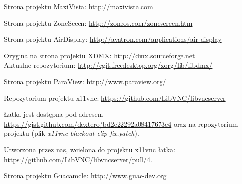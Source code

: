   \vfill

\pagebreak
\begin{thebibliography}{9}

    Strona projektu MaxiVista: \url{http://maxivista.com}

    Strona projektu ZoneSceen: \url{http://zoneos.com/zonescreen.htm}

    Strona projektu AirDisplay: \url{http://avatron.com/applications/air-display}

    Oryginalna strona projektu XDMX: \url{http://dmx.sourceforge.net} \\
    Aktualne repozytorium: \url{http://cgit.freedesktop.org/xorg/lib/libdmx/}

    Strona projektu ParaView: \url{http://www.paraview.org/}

    Repozytorium projektu x11vnc: \url{https://github.com/LibVNC/libvncserver}

    Łatka jest dostępna pod adresem \url{https://gist.github.com/dextero/bd2e22292a08417673e4} oraz na repozytorium projektu (plik \emph{x11vnc-blackout-clip-fix.patch}).

    Utworzona przez nas, wcielona do projektu x11vnc łatka: \url{https://github.com/LibVNC/libvncserver/pull/4}.

    Strona projektu Guacamole: \url{http://www.guac-dev.org}

\end{thebibliography}


